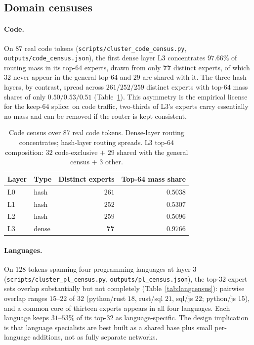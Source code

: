 \documentclass[11pt]{article}
\newcommand{\code}[1]{\texttt{#1}}
\begin{document}
\subsection{Domain censuses}
\label{sec:census}

\paragraph{Code.}
On $87$ real code tokens (\code{scripts/cluster\_code\_census.py},
\code{outputs/code\_census.json}), the first dense layer L3 concentrates
$\mathbf{97.66\%}$ of routing mass in its top-$64$ experts, drawn from only
$\mathbf{77}$ distinct experts, of which $32$ never appear in the general
top-$64$ and $29$ are shared with it. The three hash layers, by contrast, spread
across $261/252/259$ distinct experts with top-$64$ mass shares of only
$0.50/0.53/0.51$ (Table~\ref{tab:codecensus}). This asymmetry is the empirical
license for the keep-$64$ splice: on code traffic, two-thirds of L3's experts
carry essentially no mass and can be removed if the router is kept consistent.

\begin{table}[t]
\centering
\small
\begin{tabular}{llrr}
\toprule
\textbf{Layer} & \textbf{Type} & \textbf{Distinct experts} & \textbf{Top-64 mass share} \\
\midrule
L0 & hash  & $261$ & $0.5038$ \\
L1 & hash  & $252$ & $0.5307$ \\
L2 & hash  & $259$ & $0.5096$ \\
L3 & dense & $\mathbf{77}$ & $\mathbf{0.9766}$ \\
\bottomrule
\end{tabular}
\caption{Code census over $87$ real code tokens. Dense-layer routing
concentrates; hash-layer routing spreads. L3 top-$64$ composition:
$32$ code-exclusive $+$ $29$ shared with the general census $+$ $3$ other.}
\label{tab:codecensus}
\end{table}

\paragraph{Languages.}
On $128$ tokens spanning four programming languages at layer $3$
(\code{scripts/cluster\_pl\_census.py}, \code{outputs/pl\_census.json}), the
top-$32$ expert sets overlap substantially but not completely
(Table~\ref{tab:langcensus}): pairwise overlap ranges $15$--$22$ of $32$
(python/rust $18$, rust/sql $21$, sql/js $22$; python/js $15$), and a common
core of thirteen experts appears in all four languages. Each language keeps
$31$--$53\%$ of its top-$32$ as language-specific. The design implication is
that language specialists are best built as a shared base plus small
per-language additions, not as fully separate networks.
\end{document}
